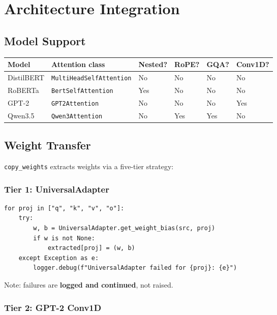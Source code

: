 \section{Architecture Integration}

\subsection{Model Support}

\begin{table}[H]
\centering
\small
\begin{tabular}{llllll}
\toprule
\textbf{Model} & \textbf{Attention class} & \textbf{Nested?} & \textbf{RoPE?} & \textbf{GQA?} & \textbf{Conv1D?} \\
\midrule
DistilBERT & \texttt{MultiHeadSelfAttention} & No & No & No & No \\
RoBERTa & \texttt{BertSelfAttention} & Yes & No & No & No \\
GPT-2 & \texttt{GPT2Attention} & No & No & No & Yes \\
Qwen3.5 & \texttt{Qwen3Attention} & No & Yes & Yes & No \\
\bottomrule
\end{tabular}
\end{table}

\subsection{Weight Transfer}

\texttt{copy\_weights} extracts weights via a five-tier strategy:

\subsubsection{Tier 1: UniversalAdapter}

\begin{lstlisting}
for proj in ["q", "k", "v", "o"]:
    try:
        w, b = UniversalAdapter.get_weight_bias(src, proj)
        if w is not None:
            extracted[proj] = (w, b)
    except Exception as e:
        logger.debug(f"UniversalAdapter failed for {proj}: {e}")
\end{lstlisting}

Note: failures are \textbf{logged and continued}, not raised.

\subsubsection{Tier 2: GPT-2 Conv1D}

